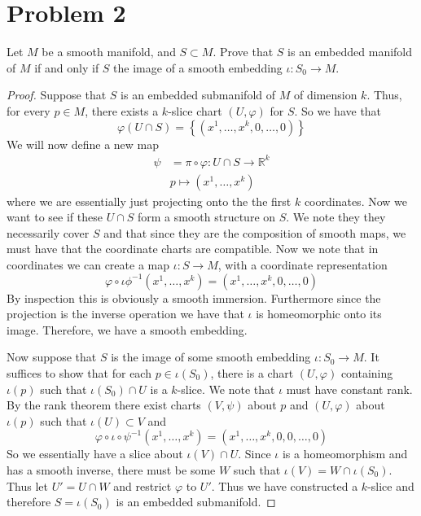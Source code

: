 \documentclass[a4paper]{article}
\begin{document}
\section*{Problem 2}%
Let $M$ be a smooth manifold, and $S \subset M$. Prove that $S$ is an embedded manifold of $M$ if and only if $S$ the image of a smooth embedding $\iota: S_0 \rightarrow M$.

\begin{proof}
  Suppose that $S$ is an embedded submanifold of $M$ of dimension $k$. Thus, for every $p \in M$, there exists a $k$-slice chart $(U,\varphi)$ for $S$. So we have that 
  \[
    \varphi(U \cap S) = \left\{ \left( x^1, \dots, x^k, 0, \dots, 0 \right) \right\}
  \]
  We will now define a new map
  \[
    \begin{aligned}
      \psi &= \pi \circ \varphi: U \cap S \rightarrow \mathds{R}^k \\
           &p \mapsto (x^1, \dots, x^k)
    \end{aligned}
  \]
  where we are essentially just projecting onto the the first $k$ coordinates. Now we want to see if these $U \cap S$ form a smooth structure on $S$. We note they they necessarily cover $S$ and that since they are the composition of smooth maps, we must have that the coordinate charts are compatible. Now we note that in coordinates we can create a map $\iota: S \rightarrow M$, with a coordinate representation 
  \[
    \varphi \circ \iota \phi^{-1}(x^1, \dots, x^k) = (x^1, \dots, x^k, 0, \dots, 0)
  \]
  By inspection this is obviously a smooth immersion. Furthermore since the projection is the inverse operation we have that $\iota$ is homeomorphic onto its image. Therefore, we have a smooth embedding.


  Now suppose that $S$ is the image of some smooth embedding $\iota: S_0 \rightarrow M$. It suffices to show that for each $p \in \iota(S_0)$, there is a chart $(U, \varphi)$ containing $\iota(p)$ such that $\iota(S_0) \cap U$ is a $k$-slice. We note that $\iota$ must have constant rank. By the rank theorem there exist charts $(V, \psi)$ about $p$ and $(U,\varphi)$ about $\iota(p)$ such that $\iota(U) \subset V$ and 
  \[
    \varphi \circ \iota \circ \psi^{-1}(x^1, \dots, x^k) = (x^1, \dots, x^k, 0, 0, \dots, 0)
  \]
  So we essentially have a slice about $\iota(V) \cap U$. Since $\iota$ is a homeomorphism and has a smooth inverse, there must be some $W$ such that $\iota(V) = W \cap \iota(S_0)$. Thus let $U' = U \cap W$ and restrict $\varphi$ to $U'$. Thus we have constructed a $k$-slice and therefore $S = \iota(S_0)$ is an embedded submanifold.
\end{proof}
\end{document}
